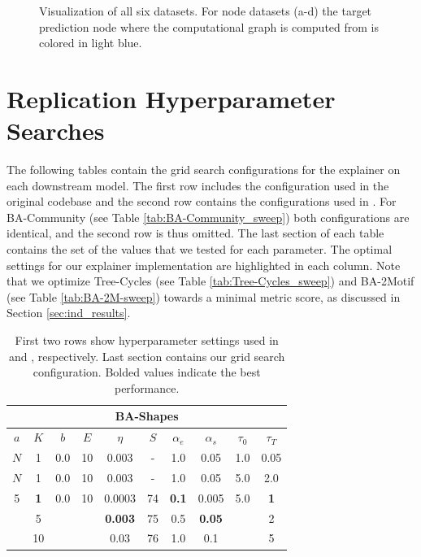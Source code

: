 \begin{figure}[H]
    \caption[Visualization of original PGExplainer datasets]{Visualization of all six datasets. For node datasets (a-d) the target prediction node where the computational graph is computed from is colored in light blue.}
\end{figure}

\section{Replication Hyperparameter Searches}
\label{sec:sweeps}
The following tables contain the grid search configurations for the explainer on each downstream model. The first row includes the configuration used in the original codebase \cite{luo2020parameterized} and the second row contains the configurations used in \cite{holdijk2021re}. For BA-Community (see Table \ref{tab:BA-Community_sweep}) both configurations are identical, and the second row is thus omitted. The last section of each table contains the set of the values that we tested for each parameter. The optimal settings for our explainer implementation are highlighted in each column. Note that we optimize Tree-Cycles (see Table \ref{tab:Tree-Cycles_sweep}) and BA-2Motif (see Table \ref{tab:BA-2M-sweep}) towards a minimal metric score, as discussed in Section \ref{sec:ind_results}.

\begin{table}[h]
  \centering
  \scriptsize
  \begin{tabular}{|c|c|c|c|c|c|c|c|c|c|}
  \hline
  \multicolumn{10}{|c|}{\textbf{BA-Shapes}} \\ \hline
  $a$ & $K$ & $b$ & $E$ & $\eta$ & $S$ & $\alpha_e$ & $\alpha_s$ & $\tau_0$ & $\tau_T$ \\ \hline
  $N$ & 1 & 0.0 & 10 & 0.003 & - & 1.0 & 0.05 & 1.0 & 0.05 \\ \hline
  $N$ & 1 & 0.0 & 10 & 0.003 & - & 1.0 & 0.05 & 5.0 & 2.0 \\ \hline
  5 & \textbf{1} & 0.0 & 10 & 0.0003 & 74 & \textbf{0.1} & 0.005 & 5.0 & \textbf{1} \\
   & 5 &  &  & \textbf{0.003} & 75 & 0.5 & \textbf{0.05} &  & 2 \\
   & 10 &  &  & 0.03 & 76 & 1.0 & 0.1 &  & 5 \\ \hline
  \end{tabular}
  \caption[BA-Shapes Grid Search]{First two rows show hyperparameter settings used in \cite{luo2020parameterized} and \cite{holdijk2021re}, respectively. Last section contains our grid search configuration. Bolded values indicate the best performance.}
\end{table}

